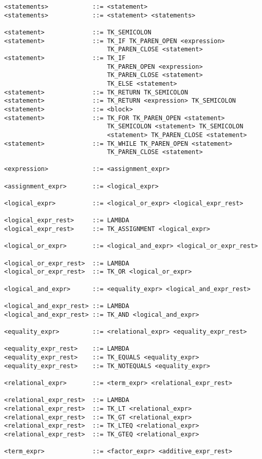 \documentclass [a4paper,titlepage]{report}
\begin{document}
\begin{verbatim}
<statements>            ::= <statement>
<statements>            ::= <statement> <statements>

<statement>             ::= TK_SEMICOLON
<statement>             ::= TK_IF TK_PAREN_OPEN <expression> 
                            TK_PAREN_CLOSE <statement>
<statement>             ::= TK_IF 
                            TK_PAREN_OPEN <expression> 
                            TK_PAREN_CLOSE <statement> 
                            TK_ELSE <statement>
<statement>             ::= TK_RETURN TK_SEMICOLON
<statement>             ::= TK_RETURN <expression> TK_SEMICOLON
<statement>             ::= <block>
<statement>             ::= TK_FOR TK_PAREN_OPEN <statement> 
                            TK_SEMICOLON <statement> TK_SEMICOLON
                            <statement> TK_PAREN_CLOSE <statement>
<statement>             ::= TK_WHILE TK_PAREN_OPEN <statement> 
                            TK_PAREN_CLOSE <statement>

<expression>            ::= <assignment_expr>

<assignment_expr>       ::= <logical_expr>

<logical_expr>          ::= <logical_or_expr> <logical_expr_rest>

<logical_expr_rest>     ::= LAMBDA
<logical_expr_rest>     ::= TK_ASSIGNMENT <logical_expr>

<logical_or_expr>       ::= <logical_and_expr> <logical_or_expr_rest>

<logical_or_expr_rest>  ::= LAMBDA
<logical_or_expr_rest>  ::= TK_OR <logical_or_expr>

<logical_and_expr>      ::= <equality_expr> <logical_and_expr_rest>

<logical_and_expr_rest> ::= LAMBDA
<logical_and_expr_rest> ::= TK_AND <logical_and_expr>

<equality_expr>         ::= <relational_expr> <equality_expr_rest>

<equality_expr_rest>    ::= LAMBDA
<equality_expr_rest>    ::= TK_EQUALS <equality_expr>
<equality_expr_rest>    ::= TK_NOTEQUALS <equality_expr>

<relational_expr>       ::= <term_expr> <relational_expr_rest>

<relational_expr_rest>  ::= LAMBDA
<relational_expr_rest>  ::= TK_LT <relational_expr>
<relational_expr_rest>  ::= TK_GT <relational_expr>
<relational_expr_rest>  ::= TK_LTEQ <relational_expr>
<relational_expr_rest>  ::= TK_GTEQ <relational_expr>

<term_expr>             ::= <factor_expr> <additive_expr_rest>


\end{verbatim}
\end{document}
